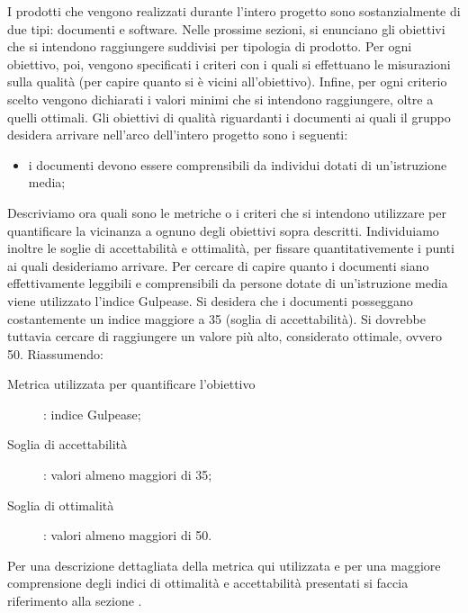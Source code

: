 		  \label{subsec:obiettiviprodotto}
			I prodotti che vengono realizzati durante l'intero progetto sono sostanzialmente di due tipi: documenti e software. Nelle prossime sezioni, si enunciano gli obiettivi che si intendono raggiungere suddivisi per tipologia di prodotto. Per ogni obiettivo, poi, vengono specificati i criteri con i quali si effettuano le misurazioni sulla qualità (per capire quanto si è vicini all'obiettivo). Infine, per ogni criterio scelto vengono dichiarati i valori minimi che si intendono raggiungere, oltre a quelli ottimali.
				Gli obiettivi di qualità riguardanti i documenti ai quali il gruppo \groupname{} desidera arrivare nell'arco dell'intero progetto sono i seguenti:
				\begin{itemize}
					\item i documenti devono essere comprensibili da individui dotati di un'istruzione media;
				\end{itemize}
				Descriviamo ora quali sono le metriche o i criteri che si intendono utilizzare per quantificare la vicinanza a ognuno degli obiettivi sopra descritti. Individuiamo inoltre le soglie di accettabilità e ottimalità, per fissare quantitativemente i punti ai quali desideriamo arrivare.
					Per cercare di capire quanto i documenti siano effettivamente leggibili e comprensibili da persone dotate di un'istruzione media viene utilizzato l'indice Gulpease. Si desidera che i documenti posseggano costantemente un indice maggiore a 35 (soglia di accettabilità). Si dovrebbe tuttavia cercare di raggiungere un valore più alto, considerato ottimale, ovvero 50. Riassumendo:
					\begin{description}
						\item[Metrica utilizzata per quantificare l'obiettivo]: indice Gulpease;
						\item[Soglia di accettabilità]: valori almeno maggiori di 35;
						\item[Soglia di ottimalità]: valori almeno maggiori di 50.
					\end{description}
					Per una descrizione dettagliata della metrica qui utilizzata e per una maggiore comprensione degli indici di ottimalità e accettabilità presentati si faccia riferimento alla sezione .
